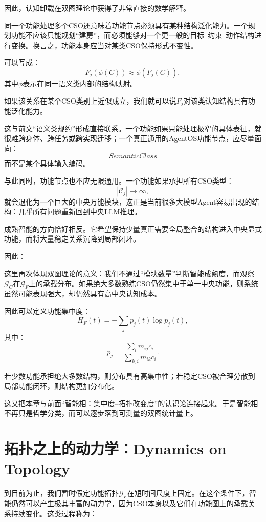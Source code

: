 因此，认知卸载在双图理论中获得了非常直接的数学解释。

同一个功能处理多个CSO还意味着功能节点必须具有某种结构泛化能力。一个规划功能不应该只能规划“建房”，而必须能够对一个更一般的目标--约束--动作结构进行变换。换言之，功能本身应当对某类CSO保持形式不变性。

可以写成：
\[
F_j
\left(
\phi(C)
\right)
\approx
\phi
\left(
F_j(C)
\right),
\]
其中$\phi$表示在同一语义类内部的结构映射。

如果该关系在某个CSO类别上近似成立，我们就可以说$F_j$对该类认知结构具有功能泛化能力。

这与前文“语义类规约”形成直接联系。一个功能如果只能处理极窄的具体表征，就很难跨身体、跨任务或跨实现迁移；一个真正通用的AgentOS功能节点，应尽量面向：
\[
SemanticClass
\]
而不是某个具体输入编码。

与此同时，功能节点也不应无限通用。一个功能如果承担所有CSO类型：
\[
|\mathcal C_j|\rightarrow\infty,
\]
就会退化为一个巨大的中央万能模块，这正是当前很多大模型Agent容易出现的结构：几乎所有问题重新回到中央LLM推理。

成熟智能的方向恰好相反。它希望保持少量真正需要全局整合的结构进入中央显式功能，而将大量稳定关系沉降到局部闭环。

因此：
\begin{statementbox}
\centering
{}
\end{statementbox}

这里再次体现双图理论的意义：我们不通过“模块数量”判断智能成熟度，而观察$\mathcal G_C$在$\mathcal G_F$上的承载分布。如果绝大多数熟练CSO仍然集中于单一中央功能，则系统虽然可能表现强大，却仍然具有高中央认知成本。

因此可以定义功能集中度：
\[
H_F(t)
=
-\sum_j
p_j(t)\log p_j(t),
\]
其中：
\[
p_j
=
\frac{
\sum_i m_{ij}c_i
}{
\sum_{k,i}m_{ik}c_i
}.
\]

若少数功能承担绝大多数结构，则分布具有高集中性；若稳定CSO被合理分散到局部功能闭环，则结构更加分布化。

这又把本章与前面“智能相：集中度--拓扑改变度”的认识论连接起来。于是智能相不再只是哲学分类，而可以逐步落到可测量的双图统计量上。

\section{拓扑之上的动力学：Dynamics on Topology}

到目前为止，我们暂时假定功能拓扑$\mathcal G_F$在短时间尺度上固定。在这个条件下，智能仍然可以产生极其丰富的动力学，因为CSO本身以及它们在功能图上的承载关系持续变化。这类过程称为：
\begin{statementbox}
\centering
{}
\end{statementbox}

